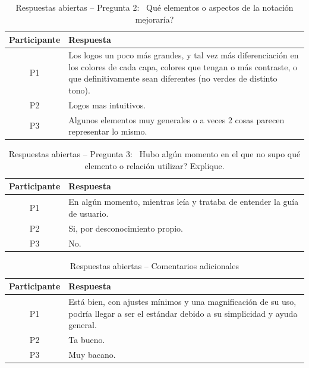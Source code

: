 \begin{table}[H]
\centering
\caption{Respuestas abiertas -- Pregunta 2:  \textquestiondown~Qué elementos o aspectos de la notación mejoraría?}
\label{tab:abiertas_p2}
\begin{tabular}{|c|p{11cm}|}
\hline
\textbf{Participante} & \textbf{Respuesta} \\
\hline
P1 & Los logos un poco más grandes, y tal vez más diferenciación en los colores de cada capa, colores que tengan o más contraste, o que definitivamente sean diferentes (no verdes de distinto tono). \\
\hline
P2 & Logos mas intuitivos. \\
\hline
P3 & Algunos elementos muy generales o a veces 2 cosas parecen representar lo mismo. \\
\hline
\end{tabular}
\end{table}

\begin{table}[H]
\centering
\caption{Respuestas abiertas -- Pregunta 3:  \textquestiondown~Hubo algún momento en el que no supo qué elemento o relación utilizar? Explique.}
\label{tab:abiertas_p3}
\begin{tabular}{|c|p{11cm}|}
\hline
\textbf{Participante} & \textbf{Respuesta} \\
\hline
P1 & En algún momento, mientras leía y trataba de entender la guía de usuario. \\
\hline
P2 & Si, por desconocimiento propio. \\
\hline
P3 & No. \\
\hline
\end{tabular}
\end{table}

\begin{table}[H]
\centering
\caption{Respuestas abiertas -- Comentarios adicionales}
\label{tab:abiertas_p4}
\begin{tabular}{|c|p{11cm}|}
\hline
\textbf{Participante} & \textbf{Respuesta} \\
\hline
P1 & Está bien, con ajustes mínimos y una magnificación de su uso, podría llegar a ser el estándar debido a su simplicidad y ayuda general. \\
\hline
P2 & Ta bueno. \\
\hline
P3 & Muy bacano. \\
\hline
\end{tabular}
\end{table}

\FloatBarrier
\cleardoublepage
{}
{}

